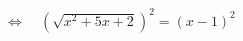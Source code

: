 \documentclass[preview]{standalone}
\begin{document}
\begin{align*}
\Leftrightarrow\quad (\sqrt{x^2 + 5x + 2})^2 = (x - 1)^2
\end{align*}
\end{document}
